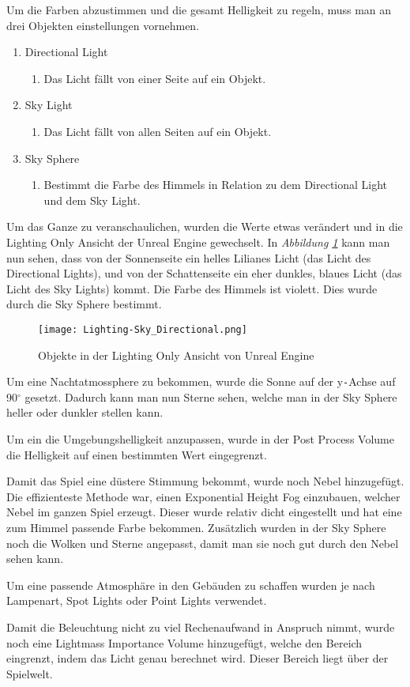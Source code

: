 Um die Farben abzustimmen und die gesamt Helligkeit zu regeln, muss man an drei Objekten einstellungen vornehmen.
\begin{enumerate}
    \item Directional Light
    \begin{enumerate}
        \item Das Licht fällt von einer Seite auf ein Objekt.
    \end{enumerate}
    \item Sky Light
    \begin{enumerate}
        \item Das Licht fällt von allen Seiten auf ein Objekt.
    \end{enumerate}
    \item Sky Sphere
    \begin{enumerate}
        \item Bestimmt die Farbe des Himmels in Relation zu dem Directional Light und dem Sky Light.
    \end{enumerate}
\end{enumerate}

Um das Ganze zu veranschaulichen, wurden die Werte etwas verändert und in die Lighting Only Ansicht der Unreal Engine gewechselt.
In \textit{Abbildung \ref{lighting:Lighting-Sky_Directional}} kann man nun sehen,
dass von der Sonnenseite ein helles Lilianes Licht (das Licht des Directional Lights), und von der Schattenseite ein eher dunkles, blaues Licht
(das Licht des Sky Lights) kommt.
Die Farbe des Himmels ist violett. Dies wurde durch die Sky Sphere bestimmt.
\begin{figure}[h]
    \centering
    \texttt{[image: Lighting-Sky\_Directional.png]}
    \caption{Objekte in der Lighting Only Ansicht von Unreal Engine}
    \label{lighting:Lighting-Sky_Directional}
\end{figure}

Um eine Nachtatmossphere zu bekommen, wurde die Sonne auf der y\verb+-+Achse auf 90$^\circ$ gesetzt. Dadurch kann man nun Sterne sehen,
welche man in der Sky Sphere heller oder dunkler stellen kann.

Um ein die Umgebungshelligkeit anzupassen, wurde in der Post Process Volume die Helligkeit auf einen bestimmten Wert eingegrenzt.

Damit das Spiel eine düstere Stimmung bekommt, wurde noch Nebel hinzugefügt. Die effizienteste Methode war, einen Exponential Height Fog einzubauen, welcher
Nebel im ganzen Spiel erzeugt. Dieser wurde relativ dicht eingestellt und hat eine zum Himmel passende Farbe bekommen. Zusätzlich wurden in der Sky Sphere noch die Wolken
und Sterne angepasst, damit man sie noch gut durch den Nebel sehen kann.

Um eine passende Atmosphäre in den Gebäuden zu schaffen wurden je nach Lampenart, Spot Lights oder Point Lights verwendet.

Damit die Beleuchtung nicht zu viel Rechenaufwand in Anspruch nimmt, wurde noch eine Lightmass Importance Volume hinzugefügt, welche den Bereich eingrenzt,
indem das Licht genau berechnet wird. Dieser Bereich liegt über der Spielwelt.

